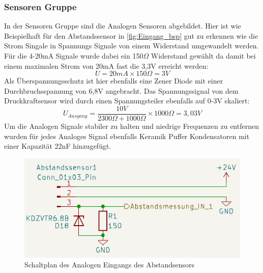 \subsubsection{Sensoren Gruppe}
In der Sensoren Gruppe sind die Analogen Sensoren abgebildet. Hier ist wie Beispielhaft für den Abstandssensor in \autoref{fig:Eingang_bsp} gut zu erkennen wie die Strom Singale in Spannungs Signale von einem Widerstand umgewandelt werden. Für die 4-20mA Signale wurde dabei ein 150$\Omega$ Widerstand gewählt da damit bei einem maximalen Strom von 20mA fast die 3,3V erreicht werden:
\begin{equation}
	U = 20mA\times150\Omega = 3V
\end{equation}
Als Überspannungsschutz ist hier ebenfalls eine Zener Diode mit einer Durchbruchsspannung von 6,8V angebracht.
Das Spannungssignal von dem Druckkraftsensor wird durch einen Spannungsteiler ebenfalls auf 0-3V skaliert:
\begin{equation}
	U_{Ausgang} = \frac{10V}{2300\Omega + 1000\Omega}\times1000\Omega = 3,03V
\end{equation}
Um die Analogen Signale stabiler zu halten und niedrige Frequenzen zu entfernen wurden für jedes Analoges Signal ebenfalls Keramik Puffer Kondensatoren mit einer Kapazität 22nF hinzugefügt.
\begin{figure}[H]
	\centering
	\includegraphics[width=1.0\textwidth]{images/Hardware/Analoger_Eingang.PNG}
	\caption{Schaltplan des Analogen Eingangs des Abstandsensors}
	\label{fig:Eingang_bsp}
\end{figure}
